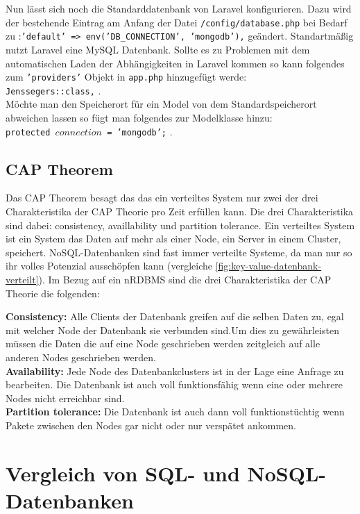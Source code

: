 \documentclass[12pt, a4paper, twoside]{article}
\begin{document}
			Nun lässt sich noch die Standarddatenbank von Laravel konfigurieren. Dazu wird der bestehende Eintrag am Anfang der Datei \texttt{/config/database.php} bei Bedarf zu :\texttt{'default' => env('DB_CONNECTION', 'mongodb'),} geändert. Standartmäßig nutzt Laravel eine MySQL Datenbank.
			Sollte es zu Problemen mit dem automatischen Laden der Abhängigkeiten in Laravel kommen so kann folgendes zum \texttt{'providers'} Objekt in \texttt{app.php} hinzugefügt werde:\\ \texttt{Jenssegers\Mongodb\MongodbServiceProvider::class,} . \\Möchte man den Speicherort für ein Model von dem Standardspeicherort abweichen lassen so fügt man folgendes zur Modelklasse hinzu:\\ \texttt{protected $connection$ = 'mongodb';} .
			
				\cite{mogodb-lara}
			
			\subsection{CAP Theorem}
			Das CAP Theorem besagt das das ein verteiltes System nur zwei der drei Charakteristika der CAP Theorie pro Zeit erfüllen kann. Die drei Charakteristika sind dabei: consistency, availlability und partition tolerance. Ein verteiltes System ist ein System das Daten auf mehr als einer Node, ein Server in einem Cluster, speichert. NoSQL-Datenbanken sind fast immer verteilte Systeme, da man  nur so ihr volles Potenzial ausschöpfen kann (vergleiche \autoref{fig:key-value-datenbank-verteilt}). Im Bezug auf ein \ac{nRDBMS} sind die drei Charakteristika der CAP Theorie die folgenden:
			
			\textbf{Consistency:} Alle Clients der Datenbank greifen auf die selben Daten zu, egal mit welcher Node der Datenbank sie verbunden sind.Um dies zu gewährleisten müssen die Daten die auf eine Node geschrieben werden zeitgleich auf alle anderen Nodes geschrieben werden.\\
			\textbf{Availability:} Jede Node des Datenbankclusters ist in der Lage eine Anfrage zu bearbeiten. Die Datenbank ist auch voll funktionsfähig wenn eine oder mehrere Nodes nicht erreichbar sind.\\
			\textbf{Partition tolerance:}  Die Datenbank ist auch dann voll funktionstüchtig wenn Pakete zwischen den Nodes gar nicht oder nur verspätet ankommen.
		
		
\section{Vergleich von SQL- und NoSQL-Datenbanken}
\end{document}
